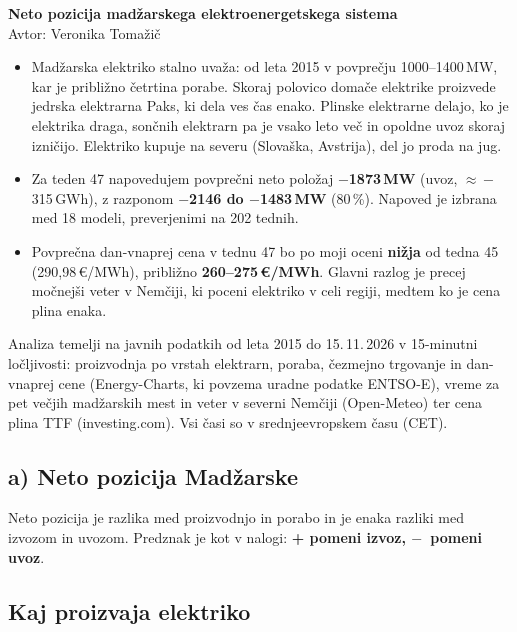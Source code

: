 \documentclass[10pt,a4paper]{article}
\newcommand{\m}{$-$}
\begin{document}
\begin{center}
{\Large\bfseries Neto pozicija madžarskega elektroenergetskega sistema}\\[3pt]
Avtor: Veronika Tomažič
\end{center}

\begin{itemize}\setlength\itemsep{2pt}
\item[\textbf{a)}] Madžarska elektriko stalno uvaža: od leta 2015 v povprečju 1000–1400\,MW, kar je približno
četrtina porabe. Skoraj polovico domače elektrike proizvede jedrska elektrarna Paks, ki dela ves čas enako.
Plinske elektrarne delajo, ko je elektrika draga, sončnih elektrarn pa je vsako leto več in opoldne uvoz
skoraj izničijo. Elektriko kupuje na severu (Slovaška, Avstrija), del jo proda na jug.
\item[\textbf{b)}] Za teden 47 napovedujem povprečni neto položaj \textbf{\m1873\,MW} (uvoz, $\approx$\,\m315\,GWh),
z razponom \textbf{\m2146 do \m1483\,MW} (80\,\%). Napoved je izbrana med 18 modeli, preverjenimi na 202 tednih.
\item[\textbf{c)}] Povprečna dan-vnaprej cena v tednu 47 bo po moji oceni \textbf{nižja} od tedna 45
(290,98\,€/MWh), približno \textbf{260–275\,€/MWh}. Glavni razlog je precej močnejši veter v Nemčiji, ki
poceni elektriko v celi regiji, medtem ko je cena plina enaka.
\end{itemize}

Analiza temelji na javnih podatkih od leta 2015 do 15.\,11.\,2026 v 15-minutni ločljivosti: proizvodnja po
vrstah elektrarn, poraba, čezmejno trgovanje in dan-vnaprej cene (Energy-Charts, ki povzema uradne podatke
ENTSO-E), vreme za pet večjih madžarskih mest in veter v severni Nemčiji (Open-Meteo) ter cena plina TTF
(investing.com). Vsi časi so v srednjeevropskem času (CET).

\subsection*{a) Neto pozicija Madžarske}

Neto pozicija je razlika med proizvodnjo in porabo in je enaka razliki med izvozom in uvozom.
Predznak je kot v nalogi: \textbf{+ pomeni izvoz, \m\ pomeni uvoz}.

\subsection*{Kaj proizvaja elektriko}
\end{document}
